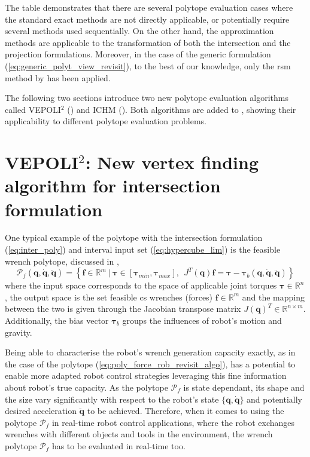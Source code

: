 The table demonstrates that there are several polytope evaluation cases where the standard exact methods are not directly applicable, or potentially require several methods used sequentially. On the other hand, the approximation methods are applicable to the transformation of both the intersection and the projection formulations. Moreover, in the case of the generic formulation (\ref{eq:generic_polyt_view_revisit}), to the best of our knowledge, only the \gls{rsm} method by \citet{carmichael_estimating_2013} has been applied.

The following two sections introduce two new polytope evaluation algorithms called VEPOLI$^2$ () and ICHM (). Both algorithms are added to , showing their applicability to different polytope evaluation problems. 


\section{VEPOLI$^2$: New vertex finding algorithm for intersection formulation}
\label{sec:algorithm_vea}

One typical example of the polytope with the intersection formulation (\ref{eq:inter_poly}) and interval input set (\ref{eq:hypercube_lim}) is the feasible wrench polytope, discussed in ,
\begin{equation}
    \mathcal{P}_f(\bm{q},\dot{\bm{q}},\ddot{\bm{q}}) = \left\{ \bm{f} \in \mathbb{R}^m ~|~ \bm{\tau}\in\left[\bm{\tau}_{min}, \bm{\tau}_{max} \right], ~~ J^T(\bm{q})\bm{f} = \bm{\tau} -\bm{\tau}_b(\bm{q},\dot{\bm{q}},\ddot{\bm{q}}) \right\}
    \label{eq:poly_force_rob_revisit_algo}
\end{equation}
where the input space corresponds to the space of applicable joint torques $\bm{\tau}\in\mathbb{R}^n$, the output space is the set feasible \gls{cs} wrenches (forces) $\bm{f}\in\mathbb{R}^m$ and the mapping between the two is given through the Jacobian transpose matrix $J(\bm{q})^T\in\mathbb{R}^{n\times m}$. Additionally, the bias vector $\bm{\tau}_b$ groups the influences of robot's motion and gravity.

Being able to characterise the robot's wrench generation capacity exactly, as in the case of the polytope (\ref{eq:poly_force_rob_revisit_algo}), has a potential to enable more adapted robot control strategies leveraging this fine information about robot's true capacity. 
As the polytope $\mathcal{P}_f$ is state dependant, its shape and the size vary significantly with respect to the robot's state $\{\bm{q},\dot{\bm{q}}\}$ and potentially desired acceleration $\ddot{\bm{q}}$ to be achieved. 
Therefore, when it comes to using the polytope $\mathcal{P}_f$ in real-time robot control applications, where the robot exchanges wrenches with different objects and tools in the environment, the wrench polytope $\mathcal{P}_f$ has to be evaluated in real-time too.


